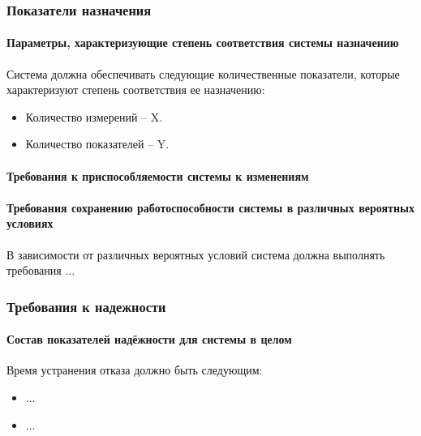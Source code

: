 \documentclass[a4paper, 12pt]{article}		%
\begin{document}

\subsubsection{Показатели назначения}

\paragraph{Параметры, характеризующие степень соответствия системы назначению\\}

Система должна обеспечивать следующие количественные показатели, которые характеризуют степень соответствия ее назначению:
\begin{itemize}
\item Количество измерений -- X.
\item Количество показателей -- Y.
\end{itemize}

\paragraph{Требования к приспособляемости системы к изменениям\\}


\paragraph{Требования сохранению работоспособности системы в различных вероятных условиях\\}

В зависимости от различных вероятных условий система должна выполнять требования ...

\subsubsection{Требования к надежности}

\paragraph{Состав показателей надёжности для системы в целом\\}

Время устранения отказа должно быть следующим:
\begin{itemize}
\item ...
\item ...
\end{itemize}
\end{document}
